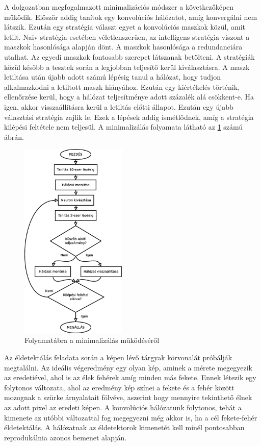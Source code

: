 \documentclass[12pt]{report}
\begin{document}
A dolgozatban megfogalmazott minimalizációs módszer a következőképen működik. Először addig tanítok egy konvolúciós hálózatot, amíg konvergálni nem látszik. Ezután egy stratégia választ egyet a konvolúciós maszkok közül, amit letilt. Naiv stratégia esetében véletlenszerűen, az intelligens stratégia viszont a maszkok hasonlósága alapján dönt. A maszkok hasonlósága a redundanciára utalhat. Az egyedi maszkok fontosabb szerepet látszanak betölteni. A stratégiák közül később a tesztek során a legjobban teljesítő kerül kiválasztásra. A maszk letiltása után újabb adott számú lépésig tanul a hálózat, hogy tudjon alkalmazkodni a letiltott maszk hiányához. Ezután egy kiértékelés történik, ellenőrzése kerül, hogy a hálózat teljesítménye adott százalék alá csökkent-e. Ha igen, akkor visszaállításra kerül a letiltás előtti állapot. Ezután egy újabb választási stratégia zajlik le. Ezek a lépések addig ismétlődnek, amíg a stratégia kilépési feltétele nem teljesül. A minimalizálás folyamata látható az \ref{folyam} számú ábrán.

\renewcommand{\figurename}{Ábra}
\begin{figure}
	\includegraphics[width=0.45\textwidth]{dia/folyam.eps}
	\caption{Folyamatábra a minimalizálás működéséről}
	\label{folyam}
\end{figure}
\renewcommand{\figurename}{Figure}

Az éldetektálás feladata során a képen lévő tárgyak körvonalát próbálják megtalálni. Az ideális végeredmény egy olyan kép, aminek a mérete megegyezik az eredetiével, ahol is az élek fehérek amíg minden más fekete. Ennek létezik egy folytonos változata, ahol az eredmény kép színei a fekete és a fehér között mozognak a szürke árnyalatait fölvéve, aszerint hogy mennyire tekinthető élnek az adott pixel az eredeti képen. A konvolúciós hálózatunk folytonos, tehát a kimenete az utóbbi változattal fog megegyezni még akkor is, ha a cél fekete-fehér éldetektálás. A hálózatnak az éldetektorok kimenetét kell minél pontosabban reprodukálnia azonos bemenet alapján.
\end{document}
